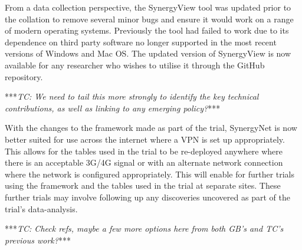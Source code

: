 \documentclass[a4paper,11pt]{article}
\begin{document}
From a data collection perspective, the SynergyView tool was updated prior to the collation to remove several minor bugs and ensure it would work on a range of modern operating systems.
Previously the tool had failed to work due to its dependence on third party software no longer supported in the most recent versions of Windows and Mac OS.
The updated version of SynergyView is now available for any researcher who wishes to utilise it through the GitHub repository.



***{\emph{TC: We need to tail this more strongly to identify the key technical contributions, as well as linking to any emerging policy?}}***

With the changes to the framework made as part of the trial, SynergyNet is now better suited for use across the internet where a VPN is set up appropriately.
This allows for the tables used in the trial to be re-deployed anywhere where there is an acceptable 3G/4G signal or with an alternate network connection where the network is configured appropriately.
This will enable for further trials using the framework and the tables used in the trial at separate sites.
These further trials may involve following up any discoveries uncovered as part of the trial's data-analysis.

***{\emph{TC: Check refs, maybe a few more options here from both GB's and TC's previous work?}}***



\end{document}
